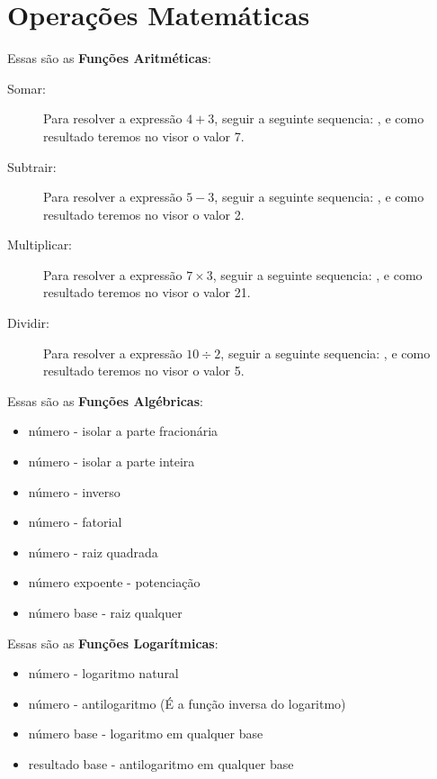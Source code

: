 \section*{Operações Matemáticas}	
Essas são as \textbf{Funções Aritméticas}: \vspace{-1em}
\begin{description}
	\item[Somar:] Para resolver a expressão $4 + 3$, seguir a seguinte sequencia:    \keystroke{$+$}, e como resultado teremos no visor o valor 7.
	\item[Subtrair:] Para resolver a expressão $5 - 3$, seguir a seguinte sequencia:    \keystroke{$-$}, e como resultado teremos no visor o valor 2.
	\item[Multiplicar:] Para resolver a expressão $7 \times 3$, seguir a seguinte sequencia:    \keystroke{$\times$}, e como resultado teremos no visor o valor 21.
	\item[Dividir:] Para resolver a expressão $10 \div 2$, seguir a seguinte sequencia:    \keystroke{$\div$}, e como resultado teremos no visor o valor 5.
\end{description}

Essas são as \textbf{Funções Algébricas}: \vspace{-1em}
\begin{itemize}
	\item número   - isolar a parte fracionária
	\item número   - isolar a parte inteira
	\item número  - inverso
	\item número   - fatorial
	\item número   - raiz quadrada
	\item número  expoente  - potenciação
	\item número  base   - raiz qualquer
\end{itemize}

Essas são as \textbf{Funções Logarítmicas}: \vspace{-1em}
\begin{itemize}
	\item número   - logaritmo natural
	\item número   - antilogaritmo (É a função inversa do logaritmo)
	\item número   base   \keystroke{$\div$} - logaritmo em qualquer base
	\item resultado  base   - antilogaritmo em qualquer base
\end{itemize}

